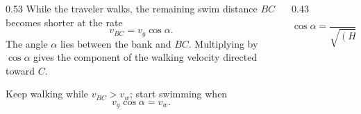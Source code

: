 \begin{solutionframe}
  \small
  \begin{columns}[T,onlytextwidth]
    \begin{column}{0.53\textwidth}
      While the traveler walks, the remaining swim distance $BC$
      becomes shorter at the rate
      \[
        v_{BC}=v_g\cos\alpha.
      \]
      The angle $\alpha$ lies between the bank and $BC$.
      Multiplying by $\cos\alpha$ gives the component of the walking
      velocity directed toward $C$.

      Keep walking while $v_{BC}>v_w$; start swimming when
      \[
        v_g\cos\alpha=v_w.
      \]
    \end{column}
    \begin{column}{0.43\textwidth}
      \centering
      \resizebox{!}{0.32\paperheight}{}
      \[
        \cos\alpha=\frac{H-AB}{\sqrt{(H-AB)^2+L^2}}.
      \]
    \end{column}
  \end{columns}
\end{solutionframe}


